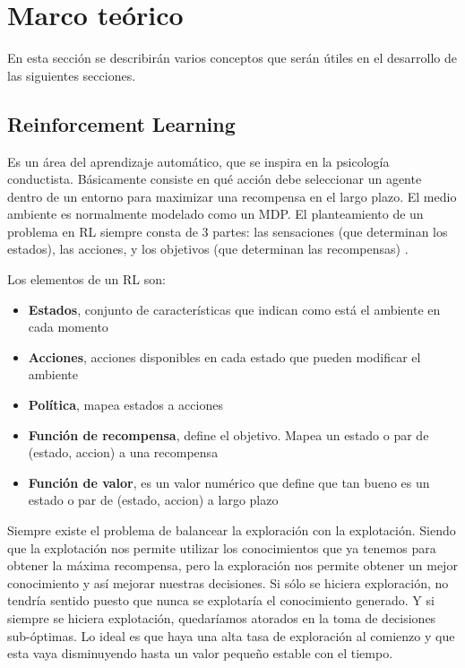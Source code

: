 \chapter{Marco teórico}

En esta sección se describirán varios conceptos que serán útiles en el desarrollo de las siguientes secciones.

\section{Reinforcement Learning}

Es un área del aprendizaje automático, que se inspira en la psicología conductista. Básicamente consiste en qué acción debe seleccionar un agente dentro de un entorno para maximizar una recompensa en el largo plazo. El medio ambiente es normalmente modelado como un \ac{MDP}. El planteamiento de un problema en \ac{RL} siempre consta de 3 partes: las sensaciones (que determinan los estados), las acciones, y los objetivos (que determinan las recompensas) \cite{sutton1998reinforcement}.

Los elementos de un \ac{RL} son:
\begin{itemize}
\item \textbf{Estados}, conjunto de características que indican como está el ambiente en cada momento
\item \textbf{Acciones}, acciones disponibles en cada estado que pueden modificar el ambiente
\item \textbf{Política}, mapea estados a acciones
\item \textbf{Función de recompensa}, define el objetivo. Mapea un estado o par de (estado, accion) a una recompensa
\item \textbf{Función de valor}, es un valor numérico que define que tan bueno es un estado o par de (estado, accion) a largo plazo
\end{itemize}

Siempre existe el problema de balancear la exploración con la explotación. Siendo que la explotación nos permite utilizar los conocimientos que ya tenemos para obtener la máxima recompensa, pero la exploración nos permite obtener un mejor conocimiento y así mejorar nuestras decisiones. Si sólo se hiciera exploración, no tendría sentido puesto que nunca se explotaría el conocimiento generado. Y si siempre se hiciera explotación, quedaríamos atorados en la toma de decisiones sub-óptimas. Lo ideal es que haya una alta tasa de exploración al comienzo y que esta vaya disminuyendo hasta un valor pequeño estable con el tiempo.

